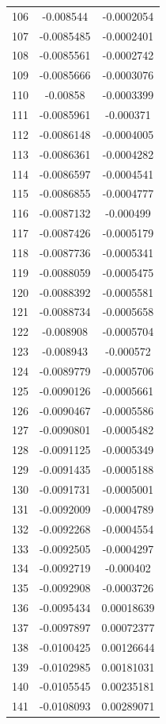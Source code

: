 \documentclass[a4paper, 11pt, oneside]{report}
\begin{document}
{\begin{longtable}{|c|c|c|}
106 & -0.008544  & -0.0002054 \\
107 & -0.0085485 & -0.0002401 \\
108 & -0.0085561 & -0.0002742 \\
109 & -0.0085666 & -0.0003076 \\
110 & -0.00858   & -0.0003399 \\
111 & -0.0085961 & -0.000371  \\
112 & -0.0086148 & -0.0004005 \\
113 & -0.0086361 & -0.0004282 \\
114 & -0.0086597 & -0.0004541 \\
115 & -0.0086855 & -0.0004777 \\
116 & -0.0087132 & -0.000499  \\
117 & -0.0087426 & -0.0005179 \\
118 & -0.0087736 & -0.0005341 \\
119 & -0.0088059 & -0.0005475 \\
120 & -0.0088392 & -0.0005581 \\
121 & -0.0088734 & -0.0005658 \\
122 & -0.008908  & -0.0005704 \\
123 & -0.008943  & -0.000572  \\
124 & -0.0089779 & -0.0005706 \\
125 & -0.0090126 & -0.0005661 \\
126 & -0.0090467 & -0.0005586 \\
127 & -0.0090801 & -0.0005482 \\
128 & -0.0091125 & -0.0005349 \\
129 & -0.0091435 & -0.0005188 \\
130 & -0.0091731 & -0.0005001 \\
131 & -0.0092009 & -0.0004789 \\
132 & -0.0092268 & -0.0004554 \\
133 & -0.0092505 & -0.0004297 \\
134 & -0.0092719 & -0.000402  \\
135 & -0.0092908 & -0.0003726 \\
136 & -0.0095434 & 0.00018639 \\
137 & -0.0097897 & 0.00072377 \\
138 & -0.0100425 & 0.00126644 \\
139 & -0.0102985 & 0.00181031 \\
140 & -0.0105545 & 0.00235181 \\
141 & -0.0108093 & 0.00289071 \\

\end{longtable}}
\end{document}
